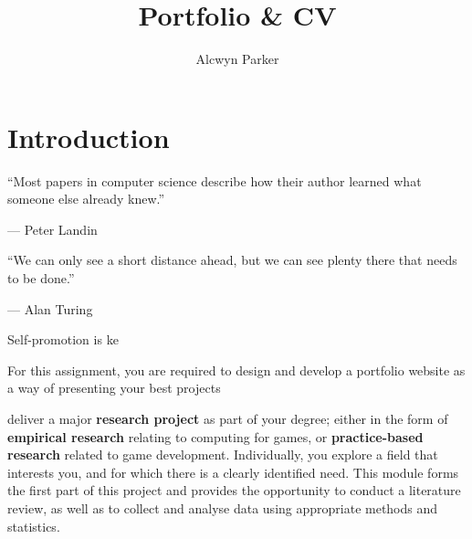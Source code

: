 \documentclass{../fal_assignment}
\title{Portfolio \& CV}
\author{Alcwyn Parker}
\begin{document}
\maketitle

\section*{Introduction}

\begin{marginquote}
``Most papers in computer science describe how their author learned what someone else already knew.''

--- Peter Landin

    \marginquoterule

``We can only see a short distance ahead, but we can see plenty there that needs to be done.''

--- Alan Turing

\end{marginquote}

Self-promotion is ke

For this assignment, you are required to design and develop a portfolio website as a way of presenting your best projects

deliver a major \textbf{research project} as part of your degree; either in the form of \textbf{empirical research} relating to computing for games, or \textbf{practice-based research} related to game development. Individually, you explore a field that interests you, and for which there is a clearly identified need. This module forms the first part of this project and provides the opportunity to conduct a literature review, as well as to collect and analyse data using appropriate methods and statistics.
\end{document}
